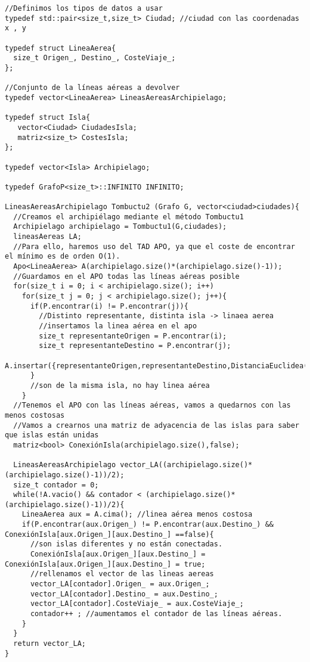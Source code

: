 \begin{verbatim}
//Definimos los tipos de datos a usar
typedef std::pair<size_t,size_t> Ciudad; //ciudad con las coordenadas x , y

typedef struct LineaAerea{
  size_t Origen_, Destino_, CosteViaje_;
};

//Conjunto de la líneas aéreas a devolver
typedef vector<LineaAerea> LineasAereasArchipielago;

typedef struct Isla{
   vector<Ciudad> CiudadesIsla;
   matriz<size_t> CostesIsla;
};

typedef vector<Isla> Archipielago;

typedef GrafoP<size_t>::INFINITO INFINITO;

LineasAereasArchipielago Tombuctu2 (Grafo G, vector<ciudad>ciudades){
  //Creamos el archipiélago mediante el método Tombuctu1
  Archipielago archipielago = Tombuctu1(G,ciudades); 
  lineasAereas LA;
  //Para ello, haremos uso del TAD APO, ya que el coste de encontrar el mínimo es de orden O(1).
  Apo<LineaAerea> A(archipielago.size()*(archipielago.size()-1));
  //Guardamos en el APO todas las líneas aéreas posible
  for(size_t i = 0; i < archipielago.size(); i++)
    for(size_t j = 0; j < archipielago.size(); j++){
      if(P.encontrar(i) != P.encontrar(j)){
        //Distinto representante, distinta isla -> linaea aerea
        //insertamos la linea aérea en el apo
        size_t representanteOrigen = P.encontrar(i);
        size_t representanteDestino = P.encontrar(j);
        A.insertar({representanteOrigen,representanteDestino,DistanciaEuclidea(ciudades[i],ciudades[j])});
      }
      //son de la misma isla, no hay linea aérea
    }
  //Tenemos el APO con las líneas aéreas, vamos a quedarnos con las menos costosas
  //Vamos a crearnos una matriz de adyacencia de las islas para saber que islas están unidas
  matriz<bool> ConexiónIsla(archipielago.size(),false);

  LineasAereasArchipielago vector_LA((archipielago.size()*(archipielago.size()-1))/2);
  size_t contador = 0;
  while(!A.vacio() && contador < (archipielago.size()*(archipielago.size()-1))/2){
    LineaAerea aux = A.cima(); //linea aérea menos costosa
    if(P.encontrar(aux.Origen_) != P.encontrar(aux.Destino_) && ConexiónIsla[aux.Origen_][aux.Destino_] ==false){ 
      //son islas diferentes y no están conectadas. 
      ConexiónIsla[aux.Origen_][aux.Destino_] = ConexiónIsla[aux.Origen_][aux.Destino_] = true;
      //rellenamos el vector de las lineas aereas
      vector_LA[contador].Origen_ = aux.Origen_;
      vector_LA[contador].Destino_ = aux.Destino_;
      vector_LA[contador].CosteViaje_ = aux.CosteViaje_;
      contador++ ; //aumentamos el contador de las líneas aéreas.
    }
  }
  return vector_LA;
}
\end{verbatim}

